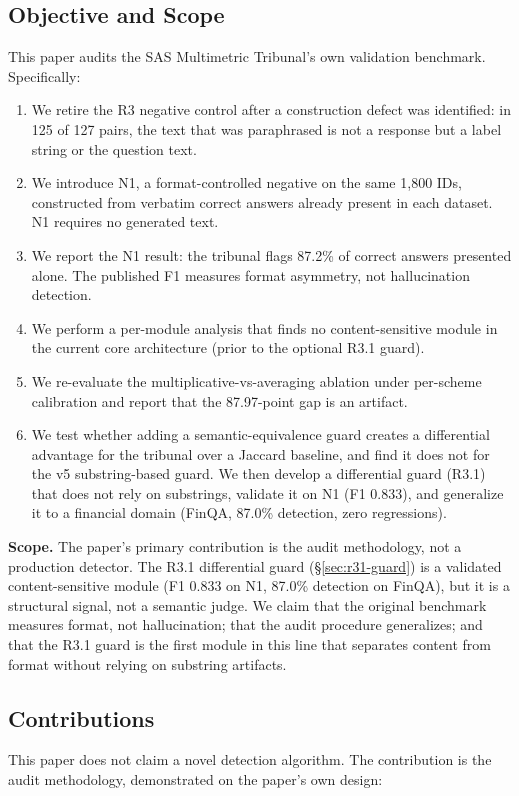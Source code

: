 \documentclass[11pt,a4paper]{article}
\begin{document}
\subsection{Objective and Scope}
This paper audits the SAS Multimetric Tribunal's own validation benchmark. Specifically:

\begin{enumerate}
    \item We retire the R3 negative control after a construction defect was identified: in 125 of 127 pairs, the text that was paraphrased is not a response but a label string or the question text.
    \item We introduce N1, a format-controlled negative on the same 1{,}800 IDs, constructed from verbatim correct answers already present in each dataset. N1 requires no generated text.
    \item We report the N1 result: the tribunal flags 87.2\% of correct answers presented alone. The published F1 measures format asymmetry, not hallucination detection.
    \item We perform a per-module analysis that finds no content-sensitive module in the current core architecture (prior to the optional R3.1 guard).
    \item We re-evaluate the multiplicative-vs-averaging ablation under per-scheme calibration and report that the 87.97-point gap is an artifact.
    \item We test whether adding a semantic-equivalence guard creates a differential advantage for the tribunal over a Jaccard baseline, and find it does not for the v5 substring-based guard. We then develop a differential guard (R3.1) that does not rely on substrings, validate it on N1 (F1 0.833), and generalize it to a financial domain (FinQA, 87.0\% detection, zero regressions).
\end{enumerate}

\textbf{Scope.} The paper's primary contribution is the audit methodology, not a production detector. The R3.1 differential guard (\S\ref{sec:r31-guard}) is a validated content-sensitive module (F1 0.833 on N1, 87.0\% detection on FinQA), but it is a structural signal, not a semantic judge. We claim that the original benchmark measures format, not hallucination; that the audit procedure generalizes; and that the R3.1 guard is the first module in this line that separates content from format without relying on substring artifacts.

\subsection{Contributions}
This paper does not claim a novel detection algorithm. The contribution is the audit methodology, demonstrated on the paper's own design:
\end{document}
